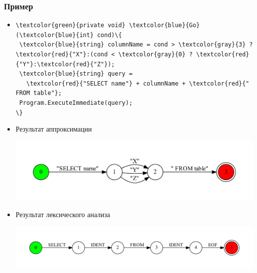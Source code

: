 \documentclass{beamer}
\begin{document}
\begin{frame}[fragile]
\transwipe[direction=90]
\frametitle{Пример}
\begin{itemize}
\item 
\begin{Verbatim}[commandchars=\\\{\}]
\textcolor{green}{private void} \textcolor{blue}{Go} (\textcolor{blue}{int} cond)\{
 \textcolor{blue}{string} columnName = cond > \textcolor{gray}{3} ? \textcolor{red}{"X"}:(cond < \textcolor{gray}{0} ? \textcolor{red}{"Y"}:\textcolor{red}{"Z"});
 \textcolor{blue}{string} query = 
   \textcolor{red}{"SELECT name"} + columnName + \textcolor{red}{" FROM table"};
 Program.ExecuteImmediate(query);
\}
\end{Verbatim}
        
\item Результат аппроксимации
\begin{center}
    {\includegraphics[width=1.0\linewidth]{tsql_test}}
\end{center}

\item Результат лексического анализа
\begin{center}
    {\includegraphics[width=1.0\linewidth]{tsql_test_appr}}
\end{center}
\end{itemize}
\end{frame}
\end{document}
